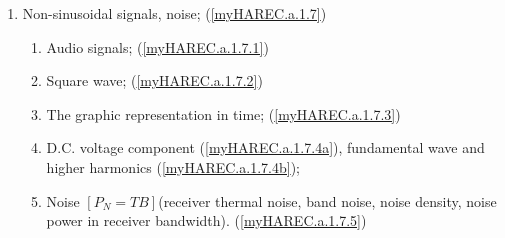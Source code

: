 \begin{enumerate}
\begin{enumerate}[noitemsep]
\item Non-sinusoidal signals, noise; (\ref{myHAREC.a.1.7})\label{HAREC.a.1.7}
\begin{enumerate}[noitemsep]
\item Audio signals; (\ref{myHAREC.a.1.7.1})\label{HAREC.a.1.7.1}
\item Square wave; (\ref{myHAREC.a.1.7.2})\label{HAREC.a.1.7.2}
\item The graphic representation in time; (\ref{myHAREC.a.1.7.3})\label{HAREC.a.1.7.3}
\item D.C. voltage component (\ref{myHAREC.a.1.7.4a})\label{HAREC.a.1.7.4a}, fundamental wave and higher harmonics (\ref{myHAREC.a.1.7.4b})\label{HAREC.a.1.7.4b};
\item Noise \(\left[P_N=TB\right]\)(receiver thermal noise, band noise, noise density, noise power in receiver bandwidth).  (\ref{myHAREC.a.1.7.5})\label{HAREC.a.1.7.5}
\end{enumerate}


\end{enumerate}
\end{enumerate}
